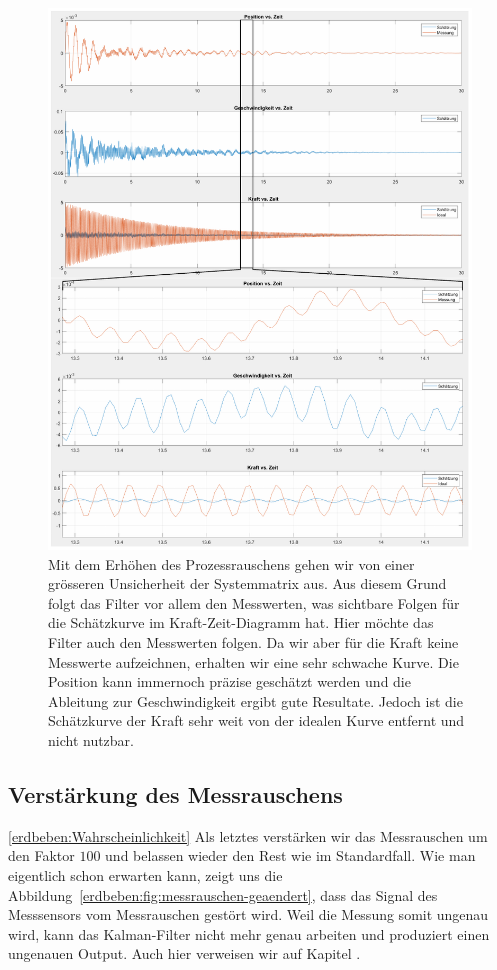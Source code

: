 \begin{figure}
	\begin{center}
		\includegraphics[width=\linewidth,keepaspectratio]{papers/erdbeben/images/Prozessrauschen_geaendert.PDF}
		\caption{Mit dem Erhöhen des Prozessrauschens gehen wir von einer grösseren Unsicherheit der Systemmatrix aus. Aus diesem Grund folgt das Filter vor allem den Messwerten, was sichtbare Folgen für die Schätzkurve im Kraft-Zeit-Diagramm hat. Hier möchte das Filter auch den Messwerten folgen. Da wir aber für die Kraft keine Messwerte aufzeichnen, erhalten wir eine sehr schwache Kurve. Die Position kann immernoch präzise geschätzt werden und die Ableitung zur Geschwindigkeit ergibt gute Resultate. Jedoch ist die Schätzkurve der Kraft sehr weit von der idealen Kurve entfernt und nicht nutzbar.}
    \label{erdbeben:fig:prozessrauschen-geaendert}
	\end{center}
\end{figure}

\subsection{Verstärkung des Messrauschens}
\ref{erdbeben:Wahrscheinlichkeit}
Als letztes verstärken wir das Messrauschen um den Faktor $100$ und belassen wieder den Rest wie im Standardfall.
Wie man eigentlich schon erwarten kann, zeigt uns die Abbildung~\ref{erdbeben:fig:messrauschen-geaendert}, dass das Signal des Messsensors vom Messrauschen gestört wird.
Weil die Messung somit ungenau wird, kann das Kalman-Filter nicht mehr genau arbeiten und produziert einen ungenauen Output.
Auch hier verweisen wir auf Kapitel .


